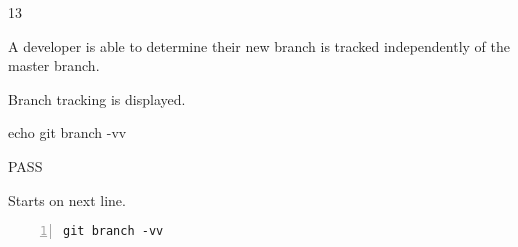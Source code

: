 \begin{description}[align=right,leftmargin=3.2cm,labelindent=3.0cm]
\item[Step:] 13
\item[Confirm:] A developer is able to determine their new branch is tracked independently of the master branch.
\item[Expectation:] Branch tracking is displayed.
\item[Command:] echo git  branch -vv
\item[Test Result:] PASS
\item[Evidence:] Starts on next line.
\end{description}
\begin{lstlisting}[numbers=left]
git branch -vv

\end{lstlisting}
